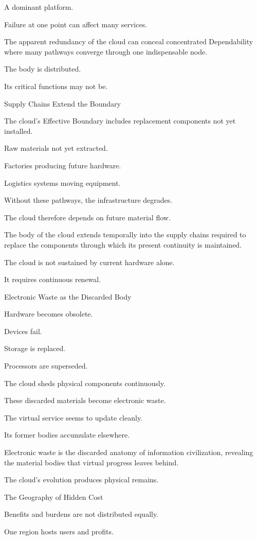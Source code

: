 A dominant platform.

Failure at one point can affect many services.

The apparent redundancy of the cloud can conceal concentrated Dependability where many pathways converge through one indispensable node.

The body is distributed.

Its critical functions may not be.

Supply Chains Extend the Boundary

The cloud’s Effective Boundary includes replacement components not yet installed.

Raw materials not yet extracted.

Factories producing future hardware.

Logistics systems moving equipment.

Without these pathways, the infrastructure degrades.

The cloud therefore depends on future material flow.

The body of the cloud extends temporally into the supply chains required to replace the components through which its present continuity is maintained.

The cloud is not sustained by current hardware alone.

It requires continuous renewal.

Electronic Waste as the Discarded Body

Hardware becomes obsolete.

Devices fail.

Storage is replaced.

Processors are superseded.

The cloud sheds physical components continuously.

These discarded materials become electronic waste.

The virtual service seems to update cleanly.

Its former bodies accumulate elsewhere.

Electronic waste is the discarded anatomy of information civilization, revealing the material bodies that virtual progress leaves behind.

The cloud’s evolution produces physical remains.

The Geography of Hidden Cost

Benefits and burdens are not distributed equally.

One region hosts users and profits.

